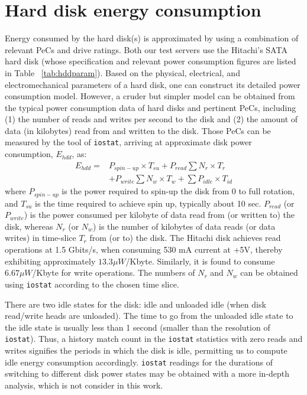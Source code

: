 \section{Hard disk energy consumption}
\label{sec:networkengery}
Energy consumed by the hard disk(s) is approximated by using a
combination of relevant PeCs and drive ratings.  Both our test servers
use the Hitachi's SATA hard disk (whose specification and relevant power
consumption figures are listed in Table ~\ref{tab:hddparam}).  Based on
the physical, electrical, and electromechanical parameters of a hard
disk, one can construct its detailed power consumption model.  However,
a cruder but simpler model can be obtained from the typical power
consumption data of hard disks and pertinent PeCs, including (1) the
number of reads and writes per second to the disk and (2) the amount of
data (in kilobytes) read from and written to the disk.  Those PeCs can
be measured by the tool of \texttt{iostat}, arriving at approximate disk
power consumption, $E_{hdd}$, as:
\begin{align*}
\label{eq:hddpwr1}
E_{hdd} = &P_{spin-up}\times T_{su}+  P_{read}\sum N_r\times T_r \nonumber\\
        &+ P_{write}\sum N_w\times T_w+ \sum P_{idle}\times T_{id}
\end{align*}
where $P_{spin-up}$ is the power required to spin-up the disk from 0 to
full rotation, and $T_{su}$ is the time required to achieve spin up,
typically about 10 sec.  $P_{read}$ (or $P_{write}$) is the power
consumed per kilobyte of data read from (or written to) the disk,
whereas $N_r$ (or $N_w$) is the number of kilobytes of data reads (or
data writes) in time-slice $T_r$ from (or to) the disk.  The Hitachi
disk achieves read operations at 1.5 Gbits/s, when consuming 530 mA
current at +5V, thereby exhibiting approximately $13.3 \mu W$/Kbyte.
Similarly, it is found to consume $6.67 \mu W$/Kbyte for write
operations.  The numbers of $N_r$ and $N_w$ can be obtained using
\texttt{iostat} according to the chosen time slice.

There are two idle states for the disk: idle and unloaded idle (when
disk read/write heads are unloaded).  The time to go from the unloaded
idle state to the idle state is usually less than 1 second (smaller than
the resolution of \texttt{iostat}).  Thus, a history match count in the
\texttt{iostat} statistics with zero reads and writes signifies the
periods in which the disk is idle, permitting us to compute idle energy
consumption accordingly.  \texttt{iostat} readings for the durations of
switching to different disk power states may be obtained with a more
in-depth analysis, which is not consider in this work.
